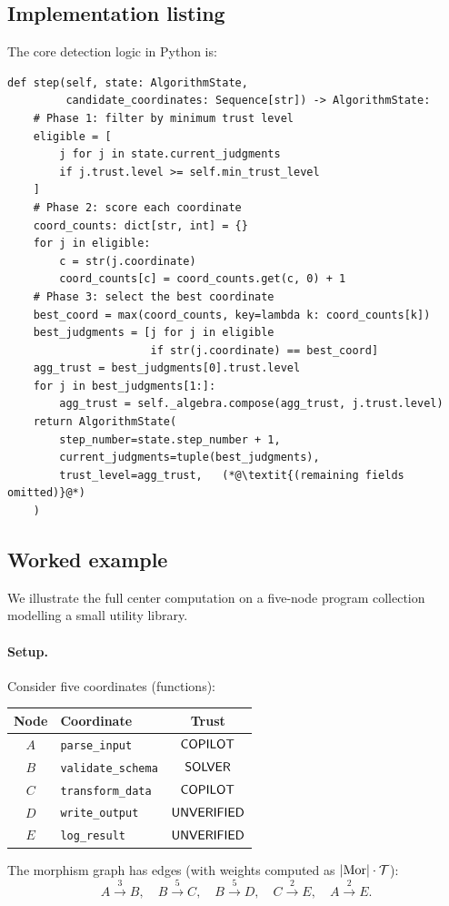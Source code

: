 \documentclass[11pt]{article}
\begin{document}
\subsection{Implementation listing}

The core detection logic in Python is:

\begin{lstlisting}[style=jugeo-python,
    caption={SemanticCenterDetectionAlgorithm.step (simplified)},
    label={lst:scd-step}]
def step(self, state: AlgorithmState,
         candidate_coordinates: Sequence[str]) -> AlgorithmState:
    # Phase 1: filter by minimum trust level
    eligible = [
        j for j in state.current_judgments
        if j.trust.level >= self.min_trust_level
    ]
    # Phase 2: score each coordinate
    coord_counts: dict[str, int] = {}
    for j in eligible:
        c = str(j.coordinate)
        coord_counts[c] = coord_counts.get(c, 0) + 1
    # Phase 3: select the best coordinate
    best_coord = max(coord_counts, key=lambda k: coord_counts[k])
    best_judgments = [j for j in eligible
                      if str(j.coordinate) == best_coord]
    agg_trust = best_judgments[0].trust.level
    for j in best_judgments[1:]:
        agg_trust = self._algebra.compose(agg_trust, j.trust.level)
    return AlgorithmState(
        step_number=state.step_number + 1,
        current_judgments=tuple(best_judgments),
        trust_level=agg_trust,   (*@\textit{(remaining fields omitted)}@*)
    )
\end{lstlisting}

\subsection{Worked example}\label{sec:worked-example}

We illustrate the full center computation on a five-node program
collection modelling a small utility library.

\paragraph{Setup.}
Consider five coordinates (functions):
\begin{center}
\begin{tabular}{clc}
\toprule
\textbf{Node} & \textbf{Coordinate} & \textbf{Trust} \\
\midrule
$A$ & \texttt{parse\_input}       & $\mathsf{COPILOT}$ \\
$B$ & \texttt{validate\_schema}   & $\mathsf{SOLVER}$  \\
$C$ & \texttt{transform\_data}    & $\mathsf{COPILOT}$ \\
$D$ & \texttt{write\_output}      & $\mathsf{UNVERIFIED}$   \\
$E$ & \texttt{log\_result}        & $\mathsf{UNVERIFIED}$   \\
\bottomrule
\end{tabular}
\end{center}
The morphism graph has edges (with weights computed as
$|\mathrm{Mor}| \cdot \mathcal{T}$):
\[
  A \xrightarrow{3} B, \quad
  B \xrightarrow{5} C, \quad
  B \xrightarrow{5} D, \quad
  C \xrightarrow{2} E, \quad
  A \xrightarrow{2} E.
\]
\end{document}
